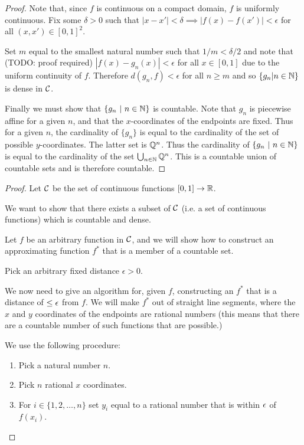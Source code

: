 \begin{enumerate}[label=(2.\arabic*)]
\begin{proof}
    Note that, since $f$ is continuous on a compact domain, $f$ is uniformly continuous. Fix some $\delta > 0$ such
    that $|x - x'| < \delta \implies |f(x) - f(x')| < \epsilon$ for all $(x, x') \in [0, 1]^2$.

    Set $m$ equal to the smallest natural number such that $1/m < \delta/2$ and note that (TODO: proof
    required) $|f(x) - g_n(x)| < \epsilon$ for all $x \in [0, 1]$ due to the uniform continuity of $f$.
    Therefore $d(g_n, f) < \epsilon$ for all $n \geq m$ and so $\{g_n | n \in \mathbb{N}\}$ is dense in $\mathcal C$.

    Finally we must show that $\{g_n ~|~ n \in \mathbb{N}\}$ is countable. Note that $g_n$ is piecewise affine for a
    given $n$, and that the $x$-coordinates of the endpoints are fixed. Thus for a given $n$, the cardinality
    of $\{g_n\}$ is equal to the cardinality of the set of possible $y$-coordinates. The latter set is $\mathbb{Q}^n$.
    Thus the cardinality of $\{g_n ~|~ n \in \mathbb{N}\}$ is equal to the cardinality of the
    set $\bigcup_{n\in \mathbb{N}} \mathbb{Q}^n$. This is a countable union of countable sets and is therefore countable.
  \end{proof}

  \begin{proof}
    Let $\mathcal C$ be the set of continuous functions $[0, 1] \to \mathbb{R}$.

    We want to show that there exists a subset of $\mathcal C$ (i.e. a set of continuous functions) which is
    countable and dense.

    Let $f$ be an arbitrary function in $\mathcal C$, and we will show how to construct an approximating
    function $f^*$ that is a member of a countable set.

    Pick an arbitrary fixed distance $\epsilon > 0$.

    We now need to give an algorithm for, given $f$, constructing an $f^*$ that is a distance of $\leq \epsilon$
    from $f$. We will make $f^*$ out of straight line segments, where the $x$ and $y$ coordinates of the
    endpoints are rational numbers (this means that there are a countable number of such functions that are
    possible.)

    We use the following procedure:
    \begin{enumerate}
    \item Pick a natural number $n$.
    \item Pick $n$ rational $x$ coordinates.
    \item For $i \in \{1, 2, \ldots, n\}$ set $y_i$ equal to a rational number that is within $\epsilon$ of $f(x_i)$.
    \end{enumerate}


\end{proof}
\end{enumerate}
